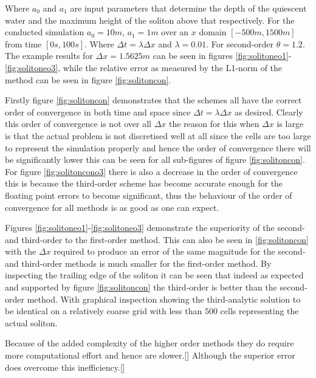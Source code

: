 \documentclass[SingleSpace,12pt]{Serre_ASCE}
\begin{document}
Where $a_0$ and $a_1$ are input parameters that determine the depth of the quiescent water and the maximum height of the soliton above that respectively. For the conducted simulation $a_0 = 10m$, $a_1 = 1m$ over an $x$ domain $\left[-500m,1500m\right]$ from time $\left[0s,100s\right]$. Where $\Delta t = \lambda \Delta x$ and $\lambda = 0.01$. For second-order $\theta = 1.2$. The example results for $\Delta x = 1.5625m$ can be seen in figures \ref{fig:solitoneo1}-\ref{fig:solitoneo3}, while the relative error as measured by the L1-norm of the method can be seen in figure \ref{fig:solitoncon}.

Firstly figure \ref{fig:solitoncon} demonstrates that the schemes all have the correct order of convergence in both time and space since $\Delta t = \lambda \Delta x$ as desired. Clearly this order of convergence is not over all $\Delta x$ the reason for this when $\Delta x$ is large is that the actual problem is not discretised well at all since the cells are too large to represent the simulation properly and hence the order of convergence there will be significantly lower this can be seen for all sub-figures of figure \ref{fig:solitoncon}. For figure \ref{fig:solitoncono3}  there is also a decrease in the order of convergence this is because the third-order scheme has become accurate enough for the floating point errors to become significant, thus the behaviour of the order of convergence for all methods is as good as one can expect. 

Figures \ref{fig:solitoneo1}-\ref{fig:solitoneo3} demonstrate the superiority of the second- and third-order to the first-order method. This can also be seen in \ref{fig:solitoncon} with the $\Delta x$ required to produce an error of the same magnitude for the second- and third-order methods is much smaller for the first-order method. By inspecting the trailing edge of the soliton it can be seen that indeed as expected and supported by figure \ref{fig:solitoncon} the third-order is better than the second-order method. With graphical inspection showing the third-analytic solution to be identical on a relatively coarse grid with less than $500$ cells representing the actual soliton. 

Because of the added complexity of the higher order methods they do require more computational effort and hence are slower.[] Although the superior error does overcome this inefficiency.[] 
\end{document}
